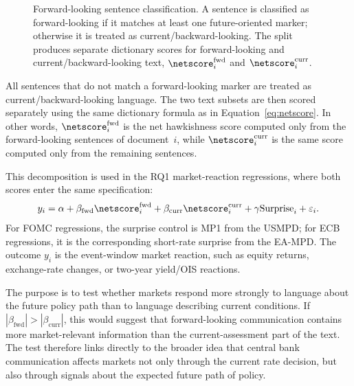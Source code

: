 \begin{figure}[htbp]
\caption[Forward-looking sentence taxonomy]{Forward-looking sentence
classification. A sentence is classified as forward-looking if it
matches at least one future-oriented marker; otherwise it is treated
as current/backward-looking. The split produces separate dictionary
scores for forward-looking and current/backward-looking text,
$\netscore^{\text{fwd}}_i$ and $\netscore^{\text{curr}}_i$.}
\label{fig:fwbw_taxonomy}
\end{figure}

All sentences that do not match a forward-looking marker are treated
as current/backward-looking language. The two text subsets are then
scored separately using the same dictionary formula as in
Equation~\eqref{eq:netscore}. In other words,
$\netscore^{\text{fwd}}_i$ is the net hawkishness score computed
only from the forward-looking sentences of document~$i$, while
$\netscore^{\text{curr}}_i$ is the same score computed only from the
remaining sentences.

This decomposition is used in the RQ1 market-reaction regressions,
where both scores enter the same specification:
\[
  y_i = \alpha
      + \beta_{\text{fwd}}\netscore^{\text{fwd}}_i
      + \beta_{\text{curr}}\netscore^{\text{curr}}_i
      + \gamma \text{Surprise}_i
      + \varepsilon_i .
\]
For FOMC regressions, the surprise control is MP1 from the USMPD;
for ECB regressions, it is the corresponding short-rate surprise
from the EA-MPD. The outcome \(y_i\) is the event-window market
reaction, such as equity returns, exchange-rate changes, or
two-year yield/OIS reactions.

The purpose is to test whether markets respond more strongly to
language about the future policy path than to language describing
current conditions. If
\(|\beta_{\text{fwd}}| > |\beta_{\text{curr}}|\), this would suggest
that forward-looking communication contains more market-relevant
information than the current-assessment part of the text. The test
therefore links directly to the broader idea that central bank
communication affects markets not only through the current rate
decision, but also through signals about the expected future path of
policy.

